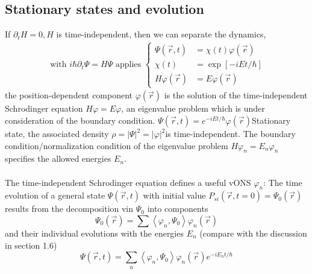 \subsection{Stationary states and evolution}
If $\partial_t H=0, H$ is time-independent, then we can separate the dynamics,
\begin{equation}
\begin{aligned}  \text{ with } i \hbar \partial_{t} \Psi=H \Psi \text{ applies }\left\{\begin{aligned}\Psi(\vec{r}, t) &=\chi(t) \varphi(\vec{r})\\ \chi(t) &=\exp [-i E t / \hbar] \\ H \varphi(\vec{r}) &=E \varphi(\vec{r}) \end{aligned}\right.\end{aligned}
\end{equation}
the position-dependent component $\varphi(\vec{r})$ is the solution of the time-independent Schrodinger equation $H\varphi = E\varphi$, an eigenvalue problem which is under consideration of the boundary condition. $\Psi(\vec{r},t)=e^{-iEt/\hbar}\varphi(\vec{r})$Stationary state, the associated density $\rho=|\Psi|^2=|\varphi|^2$is time-independent. The boundary condition/normalization condition of the eigenvalue problem $H\varphi_n=E_n\varphi_n$ specifies the allowed energies $E_n$.\\\\
The time-independent Schrodinger equation defines a useful vONS {$\varphi_n$}: The time evolution of a general state $\Psi(\vec{r},t)$ with initial value $P_{si}(\vec{r},t=0)=\Psi_0(\vec{r})$ results from the decomposition vin $\Psi_0$ into components
\begin{equation}
    \Psi_{0}(\vec{r})=\sum\left\langle\varphi_{n}, \Psi_{0}\right\rangle \varphi_{n}(\vec{r})
    \end{equation}
and their individual evolutions with the energies $E_n$ (compare with the discussion in section 1.6)
\begin{equation}
    \Psi(\vec{r}, t)=\sum_{n}\left\langle\varphi_{n}, \Psi_{0}\right\rangle \varphi_{n}(\vec{r}) e^{-i E_{n} t / \hbar}
    \end{equation}
